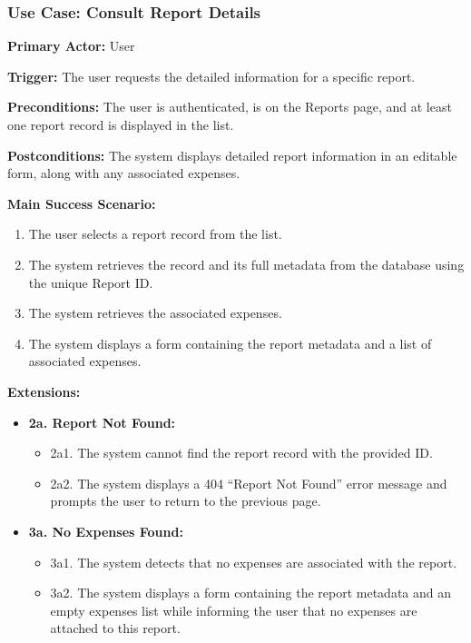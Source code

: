 \subsubsection{\textbf{Use Case: Consult Report Details}}

\textbf{Primary Actor:} User

\textbf{Trigger:} The user requests the detailed information for a specific report.

\textbf{Preconditions:} The user is authenticated, is on the Reports page, and at least one report record is displayed in the list.

\textbf{Postconditions:} The system displays detailed report information in an editable form, along with any associated expenses.

\vspace{0.5cm}

\textbf{Main Success Scenario:}

\begin{enumerate} [leftmargin=0.75cm, noitemsep]
\item The user selects a report record from the list.
\item The system retrieves the record and its full metadata from the database using the unique Report ID.
\item The system retrieves the associated expenses.
\item The system displays a form containing the report metadata and a list of associated expenses.
\end{enumerate}

\vspace{0.3cm}

\textbf{Extensions:}

\begin{itemize} [label={}, leftmargin=0.75cm, noitemsep]

    \item \textbf{2a. Report Not Found:}
    \begin{itemize} [label={}, leftmargin=0.75cm, noitemsep]
        \item 2a1. The system cannot find the report record with the provided ID.
        \item 2a2. The system displays a 404 ``Report Not Found'' error message and prompts the user to return to the previous page.
    \end{itemize}

    \item \textbf{3a. No Expenses Found:}
    \begin{itemize} [label={}, leftmargin=0.75cm, noitemsep]
        \item 3a1. The system detects that no expenses are associated with the report.
        \item 3a2. The system displays a form containing the report metadata and an empty expenses list while informing the user that no expenses are attached to this report.
    \end{itemize}

\end{itemize}

\vspace{0.3cm}
